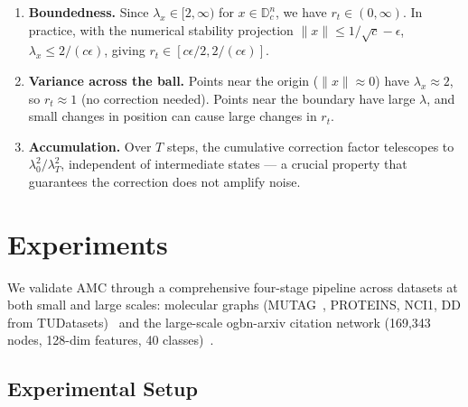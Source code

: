 \documentclass[a4paper,fleqn]{cas-dc}
\begin{document}
\begin{enumerate}
    \item \textbf{Boundedness.} Since $\lambda_x \in [2, \infty)$ for $x \in \mathbb{D}^n_c$, we have $r_t \in (0, \infty)$. In practice, with the numerical stability projection $\|x\| \leq 1/\sqrt{c} - \epsilon$, $\lambda_x \leq 2/(c\epsilon)$, giving $r_t \in [c\epsilon/2, 2/(c\epsilon)]$.
    
    \item \textbf{Variance across the ball.} Points near the origin ($\|x\| \approx 0$) have $\lambda_x \approx 2$, so $r_t \approx 1$ (no correction needed). Points near the boundary have large $\lambda$, and small changes in position can cause large changes in $r_t$.
    
    \item \textbf{Accumulation.} Over $T$ steps, the cumulative correction factor telescopes to $\lambda_0^2/\lambda_T^2$, independent of intermediate states — a crucial property that guarantees the correction does not amplify noise.
\end{enumerate}

\section{Experiments}
\label{sec:experiments}

We validate AMC through a comprehensive four-stage pipeline across datasets at both small and large scales: molecular graphs (MUTAG~\citep{MUTAG}, PROTEINS, NCI1, DD from TUDatasets)~\citep{Xu19} and the large-scale ogbn-arxiv citation network (169,343 nodes, 128-dim features, 40 classes)~\citep{hu2020open}.

\subsection{Experimental Setup}
\label{sec:setup}
\end{document}
